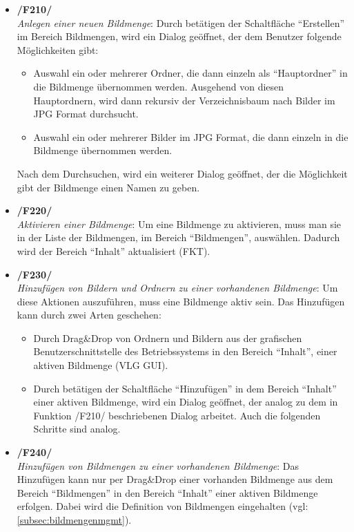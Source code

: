 	\begin{itemize}
		
		\item \textbf{/F210/}\\ \textit{Anlegen einer neuen Bildmenge}: Durch betätigen der Schaltfläche "`Erstellen"' im Bereich Bildmengen, wird ein Dialog geöffnet, der dem Benutzer folgende Möglichkeiten gibt:
			\begin{itemize}
				\item Auswahl ein oder mehrerer Ordner, die dann einzeln als "`Hauptordner"' in die Bildmenge übernommen werden. Ausgehend von diesen Hauptordnern, wird dann rekursiv der Verzeichnisbaum nach Bilder im JPG Format durchsucht.
				\item Auswahl ein oder mehrerer Bilder im JPG Format, die dann einzeln in die Bildmenge übernommen werden.
			\end{itemize}
		Nach dem Durchsuchen, wird ein weiterer Dialog geöffnet, der die Möglichkeit gibt der Bildmenge einen Namen zu geben.
		
		\item \textbf{/F220/}\\ \textit{Aktivieren einer Bildmenge}: Um eine Bildmenge zu aktivieren, muss man sie in der Liste der Bildmengen, im Bereich "`Bildmengen"', auswählen. Dadurch wird der Bereich "`Inhalt"' aktualisiert (FKT).
		
		\item \textbf{/F230/}\\ \textit{Hinzufügen von Bildern und Ordnern zu einer vorhandenen Bildmenge}: Um diese Aktionen auszuführen, muss eine Bildmenge aktiv sein. Das Hinzufügen kann durch zwei Arten geschehen:
			\begin{itemize}
				\item Durch Drag\&Drop von Ordnern und Bildern aus der grafischen Benutzerschnittstelle des Betriebssystems in den Bereich "`Inhalt"', einer aktiven Bildmenge (VLG GUI). 
				\item Durch betätigen der Schaltfläche "`Hinzufügen"' in dem Bereich "`Inhalt"' einer aktiven Bildmenge, wird ein Dialog geöffnet, der analog zu dem in Funktion /F210/ beschriebenen Dialog arbeitet. Auch die folgenden Schritte sind analog.
			\end{itemize}
		
		\item \textbf{/F240/}\\ \textit{Hinzufügen von Bildmengen zu einer vorhandenen Bildmenge}: Das Hinzufügen kann nur per Drag\&Drop einer vorhanden Bildmenge aus dem Bereich "`Bildmengen"' in den Bereich "`Inhalt"' einer aktiven Bildmenge erfolgen. Dabei wird die Definition von Bildmengen eingehalten (vgl: \ref{subsec:bildmengenmgmt}).
		

\end{itemize}
